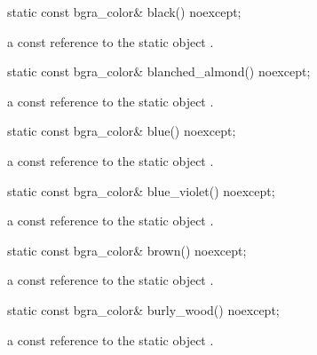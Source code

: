 \begin{itemdecl}
static const bgra_color& black() noexcept;
\end{itemdecl}
\begin{itemdescr}
\pnum
\returns
a const reference to the static  object .
\end{itemdescr}

\begin{itemdecl}
static const bgra_color& blanched_almond() noexcept;
\end{itemdecl}
\begin{itemdescr}
\pnum
\returns
a const reference to the static  object .
\end{itemdescr}

\begin{itemdecl}
static const bgra_color& blue() noexcept;
\end{itemdecl}
\begin{itemdescr}
\pnum
\returns
a const reference to the static  object .
\end{itemdescr}

\begin{itemdecl}
static const bgra_color& blue_violet() noexcept;
\end{itemdecl}
\begin{itemdescr}
\pnum
\returns
a const reference to the static  object .
\end{itemdescr}

\begin{itemdecl}
static const bgra_color& brown() noexcept;
\end{itemdecl}
\begin{itemdescr}
\pnum
\returns
a const reference to the static  object .
\end{itemdescr}

\begin{itemdecl}
static const bgra_color& burly_wood() noexcept;
\end{itemdecl}
\begin{itemdescr}
\pnum
\returns
a const reference to the static  object .
\end{itemdescr}

